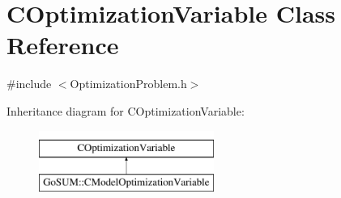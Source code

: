 \hypertarget{class_c_optimization_variable}{\section{C\-Optimization\-Variable Class Reference}
\label{class_c_optimization_variable}
}


{\ttfamily \#include $<$Optimization\-Problem.\-h$>$}

Inheritance diagram for C\-Optimization\-Variable\-:\begin{figure}[H]
\begin{center}
\leavevmode
\includegraphics[height=2.000000cm]{class_c_optimization_variable}
\end{center}
\end{figure}
